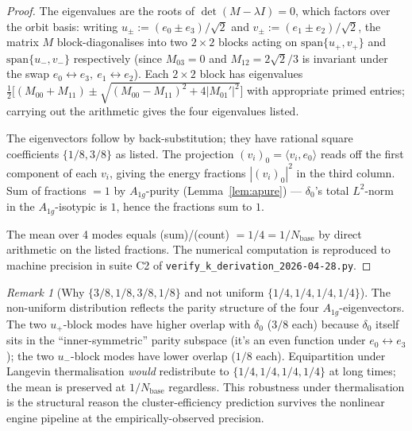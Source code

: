 \documentclass[11pt,reqno]{amsart}
\theoremstyle{plain}
\theoremstyle{definition}
\theoremstyle{remark}
\newtheorem{remark}[theorem]{Remark}
\numberwithin{equation}{section}
\newcommand{\Aoneg}{A_{1g}}
\newcommand{\Nbase}{N_{\mathrm{base}}}
\begin{document}
\begin{proof}
The eigenvalues are the roots of $\det(M - \lambda I) = 0$, which
factors over the orbit basis: writing $u_{\pm} := (e_{0} \pm e_{3})/\sqrt{2}$
and $v_{\pm} := (e_{1} \pm e_{2})/\sqrt{2}$, the matrix $M$ block-diagonalises into
two $2\times 2$ blocks acting on $\mathrm{span}\{u_{+}, v_{+}\}$ and
$\mathrm{span}\{u_{-}, v_{-}\}$ respectively (since $M_{03} = 0$ and
$M_{12} = 2\sqrt{2}/3$ is invariant under the swap $e_{0}\leftrightarrow e_{3},\ e_{1}\leftrightarrow e_{2}$).
Each $2\times 2$ block has eigenvalues
$\tfrac{1}{2}\bigl[(M_{00}+M_{11}) \pm \sqrt{(M_{00}-M_{11})^{2} + 4|M_{01}'|^{2}}\bigr]$
with appropriate primed entries; carrying out the arithmetic gives
the four eigenvalues listed.

The eigenvectors follow by back-substitution; they have rational
square coefficients $\{1/8, 3/8\}$ as listed. The projection
$(v_{i})_{0} = \langle v_{i}, e_{0}\rangle$ reads off the first
component of each $v_{i}$, giving the energy fractions
$|(v_{i})_{0}|^{2}$ in the third column. Sum of fractions $= 1$ by
$\Aoneg$-purity (Lemma~\ref{lem:apure}) — $\delta_{0}$'s
total $L^{2}$-norm in the $\Aoneg$-isotypic is $1$, hence the
fractions sum to $1$.

The mean over 4 modes equals (sum)/(count) $= 1/4 = 1/\Nbase$ by
direct arithmetic on the listed fractions. The numerical computation
is reproduced to machine precision in suite C2 of
\texttt{verify\_k\_derivation\_2026-04-28.py}.
\end{proof}

\begin{remark}[Why $\{3/8, 1/8, 3/8, 1/8\}$ and not uniform $\{1/4, 1/4, 1/4, 1/4\}$]
The non-uniform distribution reflects the parity structure of the four
$\Aoneg$-eigenvectors. The two $u_{+}$-block modes have higher overlap
with $\delta_{0}$ ($3/8$ each) because $\delta_{0}$ itself sits in the
``inner-symmetric'' parity subspace (it's an even function under
$e_{0}\leftrightarrow e_{3}$); the two $u_{-}$-block modes have lower
overlap ($1/8$ each). Equipartition under Langevin thermalisation
\emph{would} redistribute to $\{1/4, 1/4, 1/4, 1/4\}$ at long times;
the mean is preserved at $1/\Nbase$ regardless. This robustness
under thermalisation is the structural reason the cluster-efficiency
prediction survives the nonlinear engine pipeline at the
empirically-observed precision.
\end{remark}
\end{document}
